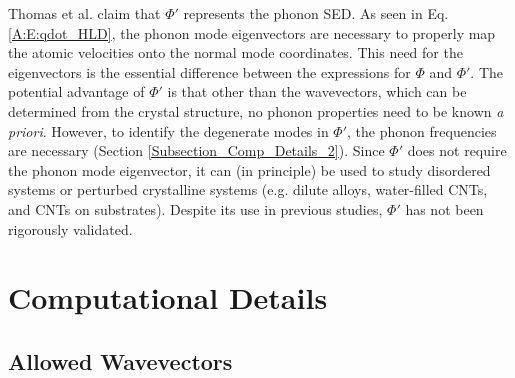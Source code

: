 \documentclass[12pt,twocolumn,iop]{/usr/share/texmf-texlive/tex/latex/iop/iopart}[/usr/share/texmf-texlive/tex/latex/iop/]
\begin{document}
Thomas et al. \cite{thomas2010c} claim that $\Phi'$ represents the phonon SED. As seen in Eq$.$ \eqref{A:E:qdot_HLD}, the phonon mode eigenvectors are necessary to properly map the atomic velocities onto the normal mode coordinates. This need for the eigenvectors is the essential difference between the expressions for $\Phi$ and $\Phi'$. The potential advantage of $\Phi'$ is that other than the wavevectors, which can be determined from the crystal structure, no phonon properties need to be known {\em a priori}. However, to identify the degenerate modes in $\Phi'$, the phonon frequencies are necessary (Section \ref{Subsection_Comp_Details_2}). Since $\Phi'$ does not require the phonon mode eigenvector, it can (in principle) be used to study disordered systems or perturbed crystalline systems (e.g. dilute alloys,\cite{shiomi2011a} water-filled CNTs,\cite{thomas2010c} and CNTs on substrates\cite{shiomi2011b}). Despite its use in previous studies, $\Phi'$ has not been rigorously validated.

\section{\label{Section_Comp}Computational Details}

\subsection{\label{Subsection_Comp_Details_1}Allowed Wavevectors}
\end{document}
